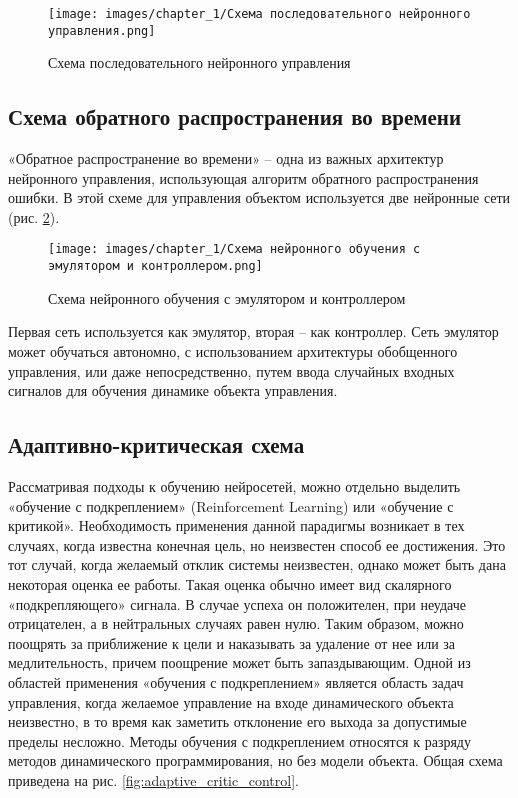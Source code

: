 \begin{figure}[H]
    \centering
    \texttt{[image: images/chapter\_1/Схема последовательного нейронного управления.png]}
    \caption{Схема последовательного нейронного управления}
    \label{fig:serial_neuro_control_scheme}
\end{figure}

\subsection{Схема обратного распространения во времени}

«Обратное распространение во времени» – одна из важных архитектур нейронного управления, использующая алгоритм обратного распространения ошибки. В этой схеме для управления объектом используется две нейронные сети (рис. \ref{fig:neuro_emulator_with_controller}).

\begin{figure}[H]
    \centering
    \texttt{[image: images/chapter\_1/Схема нейронного обучения с эмулятором и контроллером.png]}
    \caption{Схема нейронного обучения с эмулятором и контроллером}
    \label{fig:neuro_emulator_with_controller}
\end{figure}

Первая сеть используется как эмулятор, вторая – как контроллер. Сеть эмулятор может обучаться автономно, с использованием архитектуры обобщенного управления, или даже непосредственно, путем ввода случайных входных сигналов для обучения динамике объекта управления.

\subsection{Адаптивно-критическая схема}

Рассматривая подходы к обучению нейросетей, можно отдельно выделить  «обучение с подкреплением» (Reinforcement Learning) или «обучение с критикой». Необходимость применения данной парадигмы возникает в тех случаях, когда известна конечная цель, но неизвестен способ ее достижения. Это тот случай, когда желаемый отклик системы неизвестен, однако может быть дана некоторая оценка ее работы. Такая оценка обычно имеет вид скалярного «подкрепляющего» сигнала. В случае успеха он положителен, при неудаче отрицателен, а в нейтральных случаях равен нулю. Таким образом, можно поощрять за приближение к цели и наказывать за удаление от нее или за медлительность, причем поощрение может быть запаздывающим. Одной из областей применения «обучения с подкреплением» является область задач управления, когда желаемое управление на входе динамического объекта неизвестно, в то время как заметить отклонение его выхода за допустимые пределы несложно. Методы обучения с подкреплением относятся к разряду методов динамического программирования, но без модели объекта. Общая схема приведена на рис. \ref{fig:adaptive_critic_control}.

